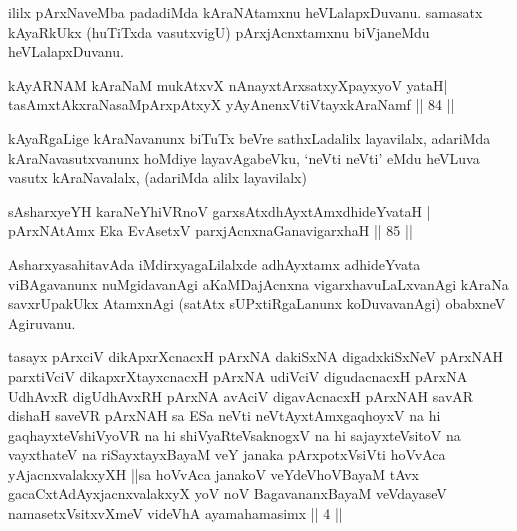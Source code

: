 \begin{artha}
ililx pArxNaveMba padadiMda kAraNAtamxnu heVLalapxDuvanu. samasatx kAyaRkUkx (huTiTxda vasutxvigU) pArxjAcnxtamxnu biVjaneMdu heVLalapxDuvanu.
\end{artha}


\begin{shl}
kAyARNAM kAraNaM mukAtxvX nAnayxtArxsatxyXpayxyoV yataH|\\
tasAmxtAkxraNasaMpArxpAtxyX yAyAnenxVtiVtayxkAraNamf \hfill || 84 || 
\end{shl}

\begin{artha}
kAyaRgaLige kAraNavanunx biTuTx beVre sathxLadalilx layavilalx, adariMda kAraNavasutxvanunx hoMdiye layavAgabeVku, `neVti neVti' eMdu heVLuva vasutx kAraNavalalx, (adariMda alilx layavilalx)
\end{artha}


\begin{shl}
sAsharxyeYH karaNeYhiVRnoV garxsAtxdhAyxtAmxdhideYvataH |\\
pArxNAtAmx Eka EvA\s \s setxV parxjAcnxnaGanavigarxhaH \hfill || 85 || 
\end{shl}

\begin{artha}
AsharxyasahitavAda iMdirxyagaLilalxde adhAyxtamx adhideYvata viBAgavanunx nuMgidavanAgi aKaMDajAcnxna vigarxhavuLaLxvanAgi kAraNa savxrUpakUkx AtamxnAgi (satAtx sUPxtiRgaLanunx koDuvavanAgi) obabxneV Agiruvanu.
\end{artha}

\begin{kandikeshl}
tasayx pArxciV dikApxrXcnacxH pArxNA dakiSxNA digadxkiSxNeV pArxNAH parxtiVciV dikapxrXtayxcnacxH pArxNA udiVciV digudacnacxH pArxNA UdhAvxR digUdhAvxRH pArxNA avAciV digavAcnacxH pArxNAH savAR dishaH saveVR pArxNAH sa ESa neVti neVtAyxtAmx\s gaqhoyxV na hi gaqhayxteV\s shiVyoVR na hi shiVyaRteV\s saknogxV na hi sajayxteV\s sitoV na vayxthateV na riSayxtayxBayaM veY janaka pArxpotxV\s siVti hoVvAca yAjacnxvalakxyXH ||sa hoVvAca janakoV veYdeVhoV\s BayaM tAvx gacaCxtAdAyxjacnxvalakxyX yoV noV BagavananxBayaM veVdayaseV namasetxV\s sitxvXmeV videVhA ayamahamasimx || 4 ||
\end{kandikeshl}

